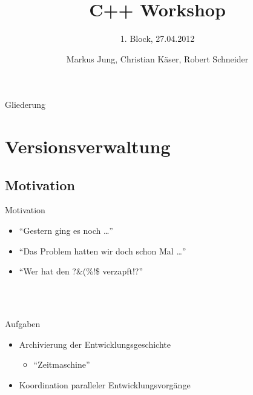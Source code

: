 \documentclass[18pt]{beamer}
\title[C++ Workshop]{C++ Workshop}
\subtitle{1. Block, 27.04.2012}
\author{Markus Jung, Christian Käser, Robert Schneider}
\institute{}
\begin{document}

\begin{frame}
\titlepage
\end{frame}

\begin{frame}{Gliederung}
\tableofcontents
\end{frame}

\section{Versionsverwaltung}
\subsection{Motivation}
\begin{frame}{Motivation}
	\begin{itemize}
		\item \enquote{Gestern ging es noch \dots}
		\item \enquote{Das Problem hatten wir doch schon Mal \dots}
		\item \enquote{Wer hat den ?\&(\%!\$ verzapft!?}
	\end{itemize}
	\ \\
	\pause
	\ \\
	\begin{block}{Aufgaben}
		\begin{itemize}
			\item Archivierung der Entwicklungsgeschichte
			\begin{itemize}
				\item \enquote{Zeitmaschine}
			\end{itemize}
			\item Koordination paralleler Entwicklungsvorgänge
		\end{itemize}
	\end{block}
\end{frame}
\end{document}
